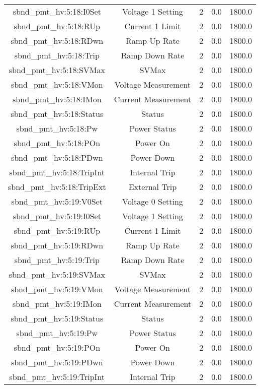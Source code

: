 \begin{table}[ptb]
\begin{tabular}{c | c c c c}
sbnd_pmt_hv:5:18:I0Set & Voltage 1 Setting & 2 & 0.0 & 1800.0\\ 
sbnd_pmt_hv:5:18:RUp & Current 1 Limit & 2 & 0.0 & 1800.0\\ 
sbnd_pmt_hv:5:18:RDwn & Ramp Up Rate & 2 & 0.0 & 1800.0\\ 
sbnd_pmt_hv:5:18:Trip & Ramp Down Rate & 2 & 0.0 & 1800.0\\ 
sbnd_pmt_hv:5:18:SVMax & SVMax & 2 & 0.0 & 1800.0\\ 
sbnd_pmt_hv:5:18:VMon & Voltage Measurement & 2 & 0.0 & 1800.0\\ 
sbnd_pmt_hv:5:18:IMon & Current Measurement & 2 & 0.0 & 1800.0\\ 
sbnd_pmt_hv:5:18:Status & Status & 2 & 0.0 & 1800.0\\ 
sbnd_pmt_hv:5:18:Pw & Power Status & 2 & 0.0 & 1800.0\\ 
sbnd_pmt_hv:5:18:POn & Power On & 2 & 0.0 & 1800.0\\ 
sbnd_pmt_hv:5:18:PDwn & Power Down & 2 & 0.0 & 1800.0\\ 
sbnd_pmt_hv:5:18:TripInt & Internal Trip & 2 & 0.0 & 1800.0\\ 
sbnd_pmt_hv:5:18:TripExt & External Trip & 2 & 0.0 & 1800.0\\ 
sbnd_pmt_hv:5:19:V0Set & Voltage 0 Setting & 2 & 0.0 & 1800.0\\ 
sbnd_pmt_hv:5:19:I0Set & Voltage 1 Setting & 2 & 0.0 & 1800.0\\ 
sbnd_pmt_hv:5:19:RUp & Current 1 Limit & 2 & 0.0 & 1800.0\\ 
sbnd_pmt_hv:5:19:RDwn & Ramp Up Rate & 2 & 0.0 & 1800.0\\ 
sbnd_pmt_hv:5:19:Trip & Ramp Down Rate & 2 & 0.0 & 1800.0\\ 
sbnd_pmt_hv:5:19:SVMax & SVMax & 2 & 0.0 & 1800.0\\ 
sbnd_pmt_hv:5:19:VMon & Voltage Measurement & 2 & 0.0 & 1800.0\\ 
sbnd_pmt_hv:5:19:IMon & Current Measurement & 2 & 0.0 & 1800.0\\ 
sbnd_pmt_hv:5:19:Status & Status & 2 & 0.0 & 1800.0\\ 
sbnd_pmt_hv:5:19:Pw & Power Status & 2 & 0.0 & 1800.0\\ 
sbnd_pmt_hv:5:19:POn & Power On & 2 & 0.0 & 1800.0\\ 
sbnd_pmt_hv:5:19:PDwn & Power Down & 2 & 0.0 & 1800.0\\ 
sbnd_pmt_hv:5:19:TripInt & Internal Trip & 2 & 0.0 & 1800.0\\ 

\end{tabular}
\end{table}

